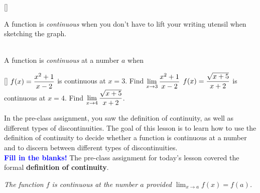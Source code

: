 \documentclass[10pt]{article}
\begin{document}
[]{
\begin{center}{\bf {}} \end{center}
A function is {\em continuous} when you don't have to lift your writing utensil when sketching the graph.
~\\
{\bf{}}
}{
\begin{center}\\
A function is {\em continuous} at a number $a$  when \\
\centering {}\end{center}
}

[]{
\example {} $\displaystyle f(x)=\frac{x^2+1}{x-2}$ is continuous at $x=3$. Find $\displaystyle \lim_{x\to3} \frac{x^2+1}{x-2}$ 
}{
{\exercise }  $\displaystyle f(x)=\frac{\sqrt{x+5}}{x+2}$ is continuous at $x=4$. Find $\displaystyle \lim_{x\to4} \frac{\sqrt{x+5}}{x+2}$.
}

 In the pre-class assignment, you saw the definition of continuity, as well as different types of discontinuities. The goal of this lesson is to learn how to use the definition of continuity to decide whether a function is continuous at a number and to discern between different types of discontinuities.\\

{\bf \textcolor{blue}{Fill in the blanks!}} The pre-class assignment for today's lesson covered the formal {\bf definition of continuity}. 
\begin{center}
{\it The function $f$ is continuous at the number $a$ provided $\displaystyle\lim_{x\to a} f(x)=f(a)$.} \\ %
\end{center}
\end{document}

